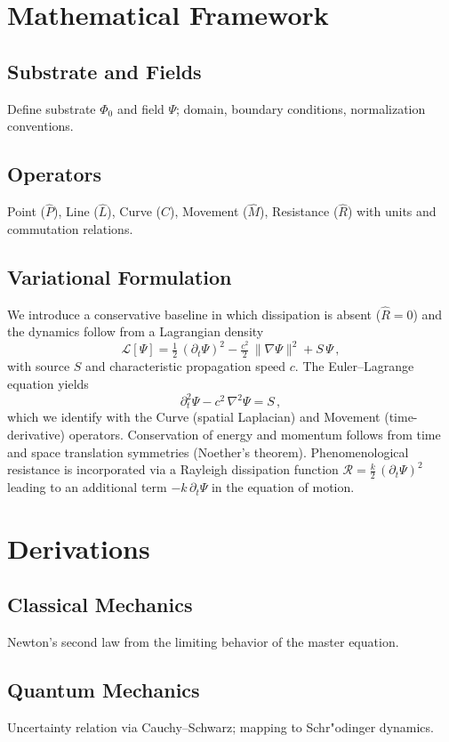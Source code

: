 \documentclass[12pt]{article}
\begin{document}
\section{Mathematical Framework}
\subsection{Substrate and Fields}
Define substrate $\Phi_0$ and field $\Psi$; domain, boundary conditions, normalization conventions.
\subsection{Operators}
Point ($\hat P$), Line ($\hat L$), Curve ($\hat C$), Movement ($\hat M$), Resistance ($\hat R$) with units and commutation relations.

\subsection{Variational Formulation}
We introduce a conservative baseline in which dissipation is absent ($\hat R=0$) and the dynamics follow from a Lagrangian density
\begin{equation}
  \mathcal{L}[\Psi] = \tfrac{1}{2}\, (\partial_t \Psi)^2 - \tfrac{c^2}{2}\, \lVert\nabla \Psi\rVert^2 + S\,\Psi\, ,
\end{equation}
with source $S$ and characteristic propagation speed $c$. The Euler--Lagrange equation yields
\begin{equation}
  \partial_t^2 \Psi - c^2\,\nabla^2\Psi = S\, ,
\end{equation}
which we identify with the Curve (spatial Laplacian) and Movement (time-derivative) operators. Conservation of energy and momentum follows from time and space translation symmetries (Noether's theorem). Phenomenological resistance is incorporated via a Rayleigh dissipation function $\mathcal{R} = \tfrac{k}{2}\,(\partial_t\Psi)^2$ leading to an additional term $-k\,\partial_t\Psi$ in the equation of motion.

\section{Derivations}
\subsection{Classical Mechanics}
Newton's second law from the limiting behavior of the master equation.
\subsection{Quantum Mechanics}
Uncertainty relation via Cauchy--Schwarz; mapping to Schr"odinger dynamics.
\end{document}
